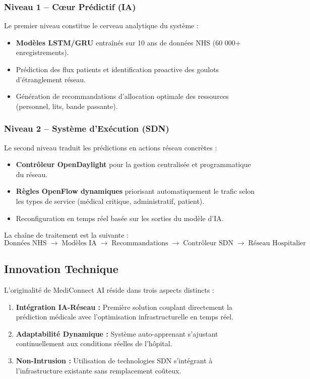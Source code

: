 \documentclass[12pt,a4paper]{article}
\begin{document}
\subsubsection{Niveau 1 -- Cœur Prédictif (IA)}

Le premier niveau constitue le cerveau analytique du système :
\begin{itemize}[leftmargin=1.5cm]
  \item \textbf{Modèles LSTM/GRU} entraînés sur 10 ans de données NHS (60 000+ enregistrements).
  \item Prédiction des flux patients et identification proactive des goulots d'étranglement réseau.
  \item Génération de recommandations d'allocation optimale des ressources (personnel, lits, bande passante).
\end{itemize}

\subsubsection{Niveau 2 -- Système d'Exécution (SDN)}

Le second niveau traduit les prédictions en actions réseau concrètes :
\begin{itemize}[leftmargin=1.5cm]
  \item \textbf{Contrôleur OpenDaylight} pour la gestion centralisée et programmatique du réseau.
  \item \textbf{Règles OpenFlow dynamiques} priorisant automatiquement le trafic selon les types de service (médical critique, administratif, patient).
  \item Reconfiguration en temps réel basée sur les sorties du modèle d'IA.
\end{itemize}

La chaîne de traitement est la suivante :
\[
\text{Données NHS} \;\longrightarrow\; \text{Modèles IA} \;\longrightarrow\; \text{Recommandations} \;\longrightarrow\; \text{Contrôleur SDN} \;\longrightarrow\; \text{Réseau Hospitalier}
\]

\subsection{Innovation Technique}

L'originalité de MediConnect AI réside dans trois aspects distincts :

\begin{enumerate}[leftmargin=1.5cm]
  \item \textbf{Intégration IA-Réseau :} Première solution couplant directement la prédiction médicale avec l'optimisation infrastructurelle en temps réel.
  \item \textbf{Adaptabilité Dynamique :} Système auto-apprenant s'ajustant continuellement aux conditions réelles de l'hôpital.
  \item \textbf{Non-Intrusion :} Utilisation de technologies SDN s'intégrant à l'infrastructure existante sans remplacement coûteux.
\end{enumerate}
\end{document}
